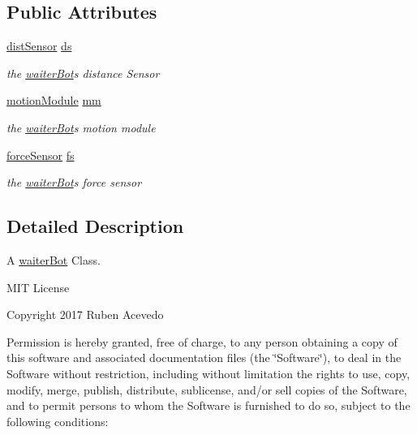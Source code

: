 \subsection*{Public Attributes}
\begin{DoxyCompactItemize}
\item 
\hyperlink{classdistSensor}{dist\+Sensor} \hyperlink{classwaiterBot_a54139b99410779ba1a3af03d45dd3dec}{ds}
\begin{DoxyCompactList}\small\item\em the \hyperlink{classwaiterBot}{waiter\+Bot}\textquotesingle{}s distance Sensor \end{DoxyCompactList}\item 
\hyperlink{classmotionModule}{motion\+Module} \hyperlink{classwaiterBot_aa477504a694726fc90b8e6fa4bcc9998}{mm}
\begin{DoxyCompactList}\small\item\em the \hyperlink{classwaiterBot}{waiter\+Bot}\textquotesingle{}s motion module \end{DoxyCompactList}\item 
\hyperlink{classforceSensor}{force\+Sensor} \hyperlink{classwaiterBot_a359f1ca46275a20771b0f922268fb72e}{fs}
\begin{DoxyCompactList}\small\item\em the \hyperlink{classwaiterBot}{waiter\+Bot}\textquotesingle{}s force sensor \end{DoxyCompactList}\end{DoxyCompactItemize}


\subsection{Detailed Description}
A \hyperlink{classwaiterBot}{waiter\+Bot} Class. 

M\+IT License

Copyright 2017 Ruben Acevedo

Permission is hereby granted, free of charge, to any person obtaining a copy of this software and associated documentation files (the \char`\"{}\+Software\char`\"{}), to deal in the Software without restriction, including without limitation the rights to use, copy, modify, merge, publish, distribute, sublicense, and/or sell copies of the Software, and to permit persons to whom the Software is furnished to do so, subject to the following conditions\+:

